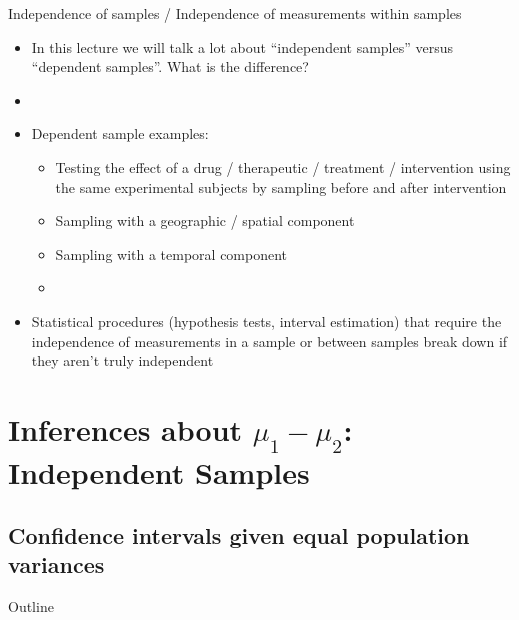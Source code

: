 \documentclass[xcolor=dvipsnames]{beamer}
\begin{document}
\begin{frame}{Independence of samples / Independence of measurements within samples}
	\begin{itemize}
		\item In this lecture we will talk a lot about ``independent samples'' versus ``dependent samples''. What is the difference?	\pause
		\item[]
		\item Dependent sample examples: \pause
		\begin{itemize}
			\item Testing the effect of a drug / therapeutic / treatment / intervention using the same experimental subjects by sampling before and after intervention \pause
			\item Sampling with a geographic / spatial component \pause
			\item Sampling with a temporal component \pause
			\item[]
		\end{itemize}
		\item Statistical procedures (hypothesis tests, interval estimation) that require the independence of measurements in a sample or between samples break down if they aren't truly independent
	\end{itemize}
\end{frame}

\section{Inferences about $\mu_1 - \mu_2$: Independent Samples}
\subsection{Confidence intervals given equal population variances}
\begin{frame}{Outline}
\tableofcontents[currentsection,subsectionstyle=show/shaded/hide]
\end{frame}
\end{document}
